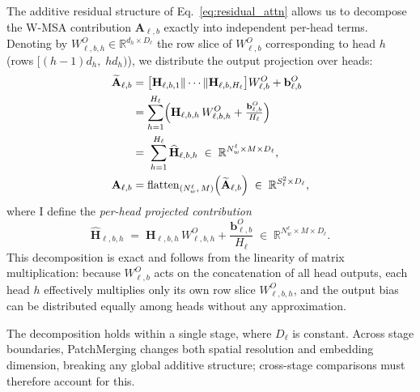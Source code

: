 The additive residual structure of Eq.~\eqref{eq:residual_attn} allows us
to decompose the W-MSA contribution $\mathbf{A}_{\ell,b}$ exactly into
independent per-head terms. Denoting by
$W^O_{\ell,b,h} \in \mathbb{R}^{d_h \times D_\ell}$ the row slice of
$W^O_{\ell,b}$ corresponding to head $h$ (rows $[(h-1)d_h,\; hd_h)$), we
distribute the output projection over heads:
\begin{align}
    \widetilde{\mathbf{A}}_{\ell,b}
    &= \bigl[\mathbf{H}_{\ell,b,1} \|\cdots\| \mathbf{H}_{\ell,b,H_\ell}\bigr]
       W^O_{\ell,b} + \mathbf{b}^O_{\ell,b} \notag \\
    &= \sum_{h=1}^{H_\ell}
       \Bigl(\mathbf{H}_{\ell,b,h}\,W^O_{\ell,b,h}
       + \tfrac{\mathbf{b}^O_{\ell,b}}{H_\ell}\Bigr) \\
    &=\; \sum_{h=1}^{H_\ell} \widehat{\mathbf{H}}_{\ell,b,h}
    \;\in\; \mathbb{R}^{N_w^\ell \times M \times D_\ell},
    \label{eq:head_decomp} \\
    \mathbf{A}_{\ell,b}
    &= \mathrm{flatten}_{(N_w^\ell,\,M)}\!\left(\widetilde{\mathbf{A}}_{\ell,b}\right)
    \;\in\; \mathbb{R}^{S_\ell^2 \times D_\ell},
\end{align}
where I define the \emph{per-head projected contribution}
\begin{equation}
    \widehat{\mathbf{H}}_{\ell,b,h}
    \;=\; \mathbf{H}_{\ell,b,h}\,W^O_{\ell,b,h}
          + \frac{\mathbf{b}^O_{\ell,b}}{H_\ell}
    \;\in\; \mathbb{R}^{N_w^\ell \times M \times D_\ell}.
    \label{eq:hhat}
\end{equation}
This decomposition is exact and follows from the linearity of matrix
multiplication: because $W^O_{\ell,b}$ acts on the concatenation of all
head outputs, each head $h$ effectively multiplies only its own row slice
$W^O_{\ell,b,h}$, and the output bias can be distributed equally among
heads without any approximation.

The decomposition holds within a single stage, where $D_\ell$ is constant.
Across stage boundaries, PatchMerging changes both spatial resolution and
embedding dimension, breaking any global additive structure; cross-stage
comparisons must therefore account for this.


